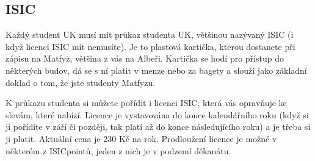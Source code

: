 \subsection{ISIC}
Každý student UK musí mít průkaz studenta UK, většinou nazývaný ISIC (i když
licenci ISIC mít nemusíte). Je to plastová kartička, kterou dostanete při zápisu
na Matfyz, většina z vás na Albeři. Kartička se hodí pro přístup do některých
budov, dá se s ní platit v menze nebo za bagety a slouží jako základní doklad o
tom, že jste studenty Matfyzu.

K průkazu studenta si můžete pořídit i licenci ISIC, která vás opravňuje ke
slevám, které nabízí. Licence je vystavována do konce kalendářního roku
(když si ji pořídíte v září či později, tak platí až do konce následujícího
roku) a je třeba si ji platit. Aktuální cena je 230 Kč na rok. Prodloužení
licence je možné v některém z ISICpointů, jeden z nich je v podzemí děkanátu.